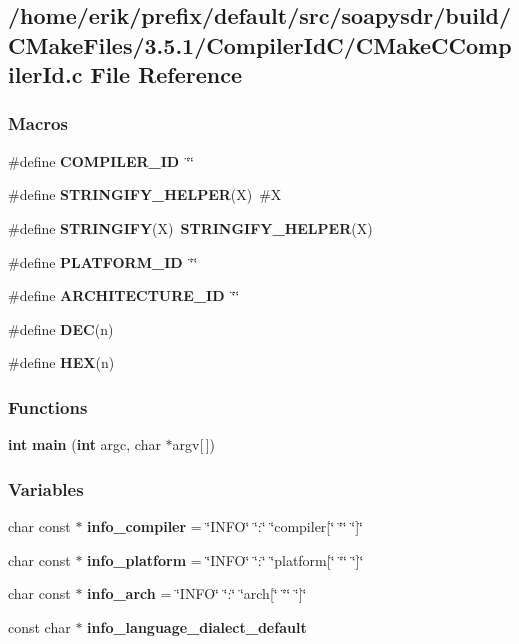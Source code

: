 \subsection{/home/erik/prefix/default/src/soapysdr/build/\+C\+Make\+Files/3.5.1/\+Compiler\+Id\+C/\+C\+Make\+C\+Compiler\+Id.c File Reference}
\label{soapysdr_2build_2CMakeFiles_23_85_81_2CompilerIdC_2CMakeCCompilerId_8c}
\subsubsection*{Macros}
\begin{DoxyCompactItemize}
\item 
\#define {\bf C\+O\+M\+P\+I\+L\+E\+R\+\_\+\+ID}~\char`\"{}\char`\"{}
\item 
\#define {\bf S\+T\+R\+I\+N\+G\+I\+F\+Y\+\_\+\+H\+E\+L\+P\+ER}(X)~\#X
\item 
\#define {\bf S\+T\+R\+I\+N\+G\+I\+FY}(X)~{\bf S\+T\+R\+I\+N\+G\+I\+F\+Y\+\_\+\+H\+E\+L\+P\+ER}(X)
\item 
\#define {\bf P\+L\+A\+T\+F\+O\+R\+M\+\_\+\+ID}~\char`\"{}\char`\"{}
\item 
\#define {\bf A\+R\+C\+H\+I\+T\+E\+C\+T\+U\+R\+E\+\_\+\+ID}~\char`\"{}\char`\"{}
\item 
\#define {\bf D\+EC}(n)
\item 
\#define {\bf H\+EX}(n)
\end{DoxyCompactItemize}
\subsubsection*{Functions}
\begin{DoxyCompactItemize}
\item 
{\bf int} {\bf main} ({\bf int} argc, char $\ast$argv[$\,$])
\end{DoxyCompactItemize}
\subsubsection*{Variables}
\begin{DoxyCompactItemize}
\item 
char const $\ast$ {\bf info\+\_\+compiler} = \char`\"{}I\+N\+FO\char`\"{} \char`\"{}\+:\char`\"{} \char`\"{}compiler[\char`\"{} \char`\"{}\char`\"{} \char`\"{}]\char`\"{}
\item 
char const $\ast$ {\bf info\+\_\+platform} = \char`\"{}I\+N\+FO\char`\"{} \char`\"{}\+:\char`\"{} \char`\"{}platform[\char`\"{} \char`\"{}\char`\"{} \char`\"{}]\char`\"{}
\item 
char const $\ast$ {\bf info\+\_\+arch} = \char`\"{}I\+N\+FO\char`\"{} \char`\"{}\+:\char`\"{} \char`\"{}arch[\char`\"{} \char`\"{}\char`\"{} \char`\"{}]\char`\"{}
\item 
const char $\ast$ {\bf info\+\_\+language\+\_\+dialect\+\_\+default}
\end{DoxyCompactItemize}


